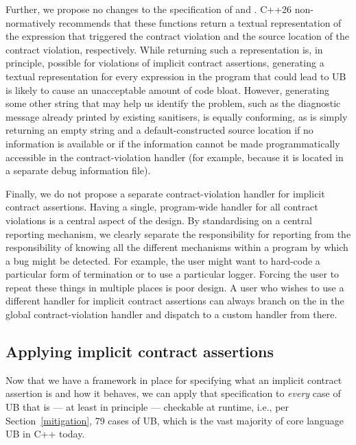 Further, we propose no changes to the specification of  and . C++26 non-normatively recommends that these functions return a textual representation of the expression that triggered the contract violation and the source location of the contract violation, respectively. While returning such a representation is, in principle, possible for violations of implicit contract assertions, generating a textual representation for every expression in the program that could lead to UB is likely to cause an unacceptable amount of code bloat. However, generating some other string that may help us identify the problem, such as the diagnostic message already printed by existing sanitisers, is equally conforming, as is simply returning an empty string and a default-constructed source location if no information is available or if the information cannot be made programmatically accessible in the contract-violation handler (for example,
because it is located in a separate debug information file). 

Finally, we do not propose a separate contract-violation handler for implicit contract assertions. Having a single, program-wide handler for all contract violations is a central aspect of the \cite{P2900R14} design. By standardising on a central reporting mechanism, we clearly separate the responsibility for reporting from the responsibility of knowing all the different mechanisms within a program by which a bug might be detected. For example, the user might want to hard-code a particular form of termination or to use a particular logger. Forcing the user to repeat these things in multiple places is poor design. A user who wishes to use a different handler for implicit contract assertions can always branch on the  in the global contract-violation handler and dispatch to a custom handler from there.

\subsection{Applying implicit contract assertions}
\label{applyicas}

Now that we have a framework in place for specifying what an implicit contract assertion is and how it behaves, we can apply that specification to \emph{every} case of UB  that is --- at least in principle --- checkable at runtime, i.e., per Section~\ref{mitigation}, 79 cases of UB, which is the vast majority of core language UB in C++ today.

